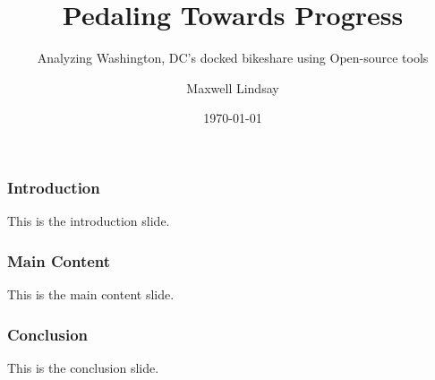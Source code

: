 \documentclass{beamer}
\title{Pedaling Towards Progress}
\subtitle{Analyzing Washington, DC's docked bikeshare using Open-source tools}
\author{Maxwell Lindsay}
\institute{Van Oord}
\date{\today}
\begin{document}
\begin{frame}
  \titlepage
\end{frame}

\begin{frame}
  \frametitle{Introduction}
  This is the introduction slide.
\end{frame}

\begin{frame}
  \frametitle{Main Content}
  This is the main content slide.
\end{frame}

\begin{frame}
  \frametitle{Conclusion}
  This is the conclusion slide.
\end{frame}
\end{document}
